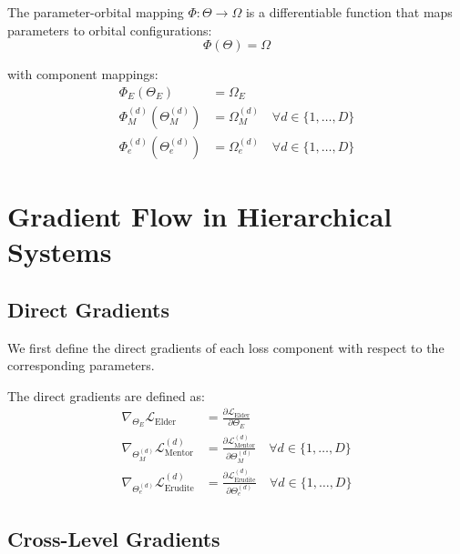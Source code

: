 \begin{definition}
The parameter-orbital mapping $\Phi: \Theta \to \Omega$ is a differentiable function that maps parameters to orbital configurations:
\begin{equation}
\Phi(\Theta) = \Omega
\end{equation}

with component mappings:
\begin{align}
\Phi_E(\Theta_E) &= \Omega_E \\
\Phi_M^{(d)}(\Theta_M^{(d)}) &= \Omega_M^{(d)} \quad \forall d \in \{1, \ldots, D\} \\
\Phi_e^{(d)}(\Theta_e^{(d)}) &= \Omega_e^{(d)} \quad \forall d \in \{1, \ldots, D\}
\end{align}
\end{definition}

\section{Gradient Flow in Hierarchical Systems}

\subsection{Direct Gradients}

We first define the direct gradients of each loss component with respect to the corresponding parameters.

\begin{definition}
The direct gradients are defined as:
\begin{align}
\nabla_{\Theta_E} \mathcal{L}_{\text{Elder}} &= \frac{\partial \mathcal{L}_{\text{Elder}}}{\partial \Theta_E} \\
\nabla_{\Theta_M^{(d)}} \mathcal{L}_{\text{Mentor}}^{(d)} &= \frac{\partial \mathcal{L}_{\text{Mentor}}^{(d)}}{\partial \Theta_M^{(d)}} \quad \forall d \in \{1, \ldots, D\} \\
\nabla_{\Theta_e^{(d)}} \mathcal{L}_{\text{Erudite}}^{(d)} &= \frac{\partial \mathcal{L}_{\text{Erudite}}^{(d)}}{\partial \Theta_e^{(d)}} \quad \forall d \in \{1, \ldots, D\}
\end{align}
\end{definition}

\subsection{Cross-Level Gradients}

